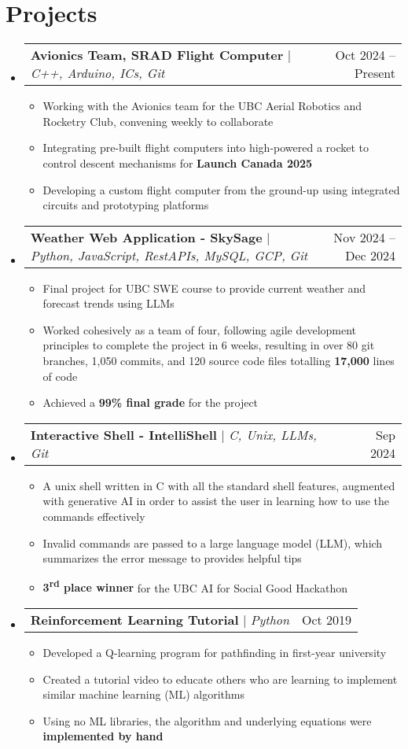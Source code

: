 \documentclass[letterpaper,11.5pt]{article}
\makeatletter
\newcommand{\resumeItem}[1]{
  \item\small{
    {#1 \vspace{-2pt}}
  }
}
\newcommand{\resumeProjectHeading}[2]{
    \item
    \begin{tabular*}{0.97\textwidth}{l@{\extracolsep{\fill}}r}
      \small#1 & #2 \\
    \end{tabular*}\vspace{-7pt}
}
\newcommand{\resumeSubHeadingListStart}{\begin{itemize}[leftmargin=0.15in, label={}]}
\newcommand{\resumeSubHeadingListEnd}{\end{itemize}}
\newcommand{\resumeItemListStart}{\begin{itemize}}
\newcommand{\resumeItemListEnd}{\end{itemize}\vspace{-5pt}}
\def\projectSpaceBefore{1pt}
\makeatother
\begin{document}
\section{Projects}
    \resumeSubHeadingListStart
      \resumeProjectHeading
          {\textbf{Avionics Team, SRAD Flight Computer} $|$ \emph{C++, Arduino, ICs, Git}}{Oct 2024 -- Present}
          \resumeItemListStart
            \vspace{\projectSpaceBefore}
            \resumeItem{Working with the Avionics team for the UBC Aerial Robotics and Rocketry Club, convening weekly to collaborate}
            \resumeItem{Integrating pre-built flight computers into high-powered a rocket to control descent mechanisms for \textbf{Launch Canada 2025}}
            \resumeItem{Developing a custom flight computer from the ground-up using integrated circuits and prototyping platforms}
          \resumeItemListEnd
      \resumeProjectHeading
          {\textbf{Weather Web Application - SkySage} $|$ \emph{Python, JavaScript, RestAPIs, MySQL, GCP, Git}}{Nov 2024 -- Dec 2024}
          \resumeItemListStart
            \vspace{\projectSpaceBefore}
            \resumeItem{Final project for UBC SWE course to provide current weather and forecast trends using LLMs}
            \resumeItem{Worked cohesively as a team of four, following agile development principles to complete the project in 6 weeks, resulting in over 80 git branches, 1,050 commits, and 120 source code files totalling \textbf{17,000} lines of code}
            \resumeItem{Achieved a \textbf{99\% final grade} for the project}
          \resumeItemListEnd
      \resumeProjectHeading
          {\textbf{Interactive Shell - IntelliShell} $|$ \emph{C, Unix, LLMs, Git}}{Sep 2024}
          \resumeItemListStart
            \vspace{\projectSpaceBefore}
            \resumeItem{A unix shell written in C with all the standard shell features, augmented with generative AI in order to assist the user in learning how to use the commands effectively}
            \resumeItem{Invalid commands are passed to a large language model (LLM), which summarizes the error message to provides helpful tips}
            \resumeItem{\textbf{3\textsuperscript{rd} place winner} for the UBC AI for Social Good Hackathon}
          \resumeItemListEnd
      \resumeProjectHeading
          {\textbf{Reinforcement Learning Tutorial} $|$ \emph{Python}}{Oct 2019}
          \resumeItemListStart
            \vspace{\projectSpaceBefore}
            \resumeItem{Developed a Q-learning program for pathfinding in first-year university}
            \resumeItem{Created a tutorial video to educate others who are learning to implement similar machine learning (ML) algorithms}
            \resumeItem{Using no ML libraries, the algorithm and underlying equations were \textbf{implemented by hand}}
          \resumeItemListEnd
    \resumeSubHeadingListEnd
\end{document}
